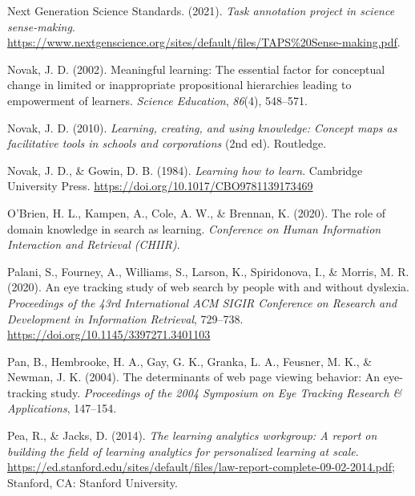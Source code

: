 \documentclass[letterpaper, nobind]{templates/ociamthesis}
\newlength{\cslhangindent}
\newenvironment{CSLReferences}[2] %
 {%
  \setlength{\parindent}{0pt}
  \ifodd #1
  \let\oldpar\par
  \def\par{\hangindent=\cslhangindent\oldpar}
  \fi
  \setlength{\parskip}{1mm}
  \setlength{\baselineskip}{6mm}
 }%
 {}
\begin{document}
\begin{CSLReferences}{1}{0}
\leavevmode{}%
Next Generation Science Standards. (2021). \emph{Task annotation project in science \textbar{} sense-making}. \url{https://www.nextgenscience.org/sites/default/files/TAPS\%20Sense-making.pdf}.

\leavevmode{}%
Novak, J. D. (2002). Meaningful learning: The essential factor for conceptual change in limited or inappropriate propositional hierarchies leading to empowerment of learners. \emph{Science Education}, \emph{86}(4), 548--571.

\leavevmode{}%
Novak, J. D. (2010). \emph{Learning, creating, and using knowledge: Concept maps as facilitative tools in schools and corporations} (2nd ed). {Routledge}.

\leavevmode{}%
Novak, J. D., \& Gowin, D. B. (1984). \emph{Learning how to learn}. Cambridge University Press. \url{https://doi.org/10.1017/CBO9781139173469}

\leavevmode{}%
O'Brien, H. L., Kampen, A., Cole, A. W., \& Brennan, K. (2020). The role of domain knowledge in search as learning. \emph{Conference on Human Information Interaction and Retrieval (CHIIR)}.

\leavevmode{}%
Palani, S., Fourney, A., Williams, S., Larson, K., Spiridonova, I., \& Morris, M. R. (2020). An eye tracking study of web search by people with and without dyslexia. \emph{Proceedings of the 43rd International ACM SIGIR Conference on Research and Development in Information Retrieval}, 729--738. \url{https://doi.org/10.1145/3397271.3401103}

\leavevmode{}%
Pan, B., Hembrooke, H. A., Gay, G. K., Granka, L. A., Feusner, M. K., \& Newman, J. K. (2004). The determinants of web page viewing behavior: An eye-tracking study. \emph{Proceedings of the 2004 Symposium on Eye Tracking Research \& Applications}, 147--154.

\leavevmode{}%
Pea, R., \& Jacks, D. (2014). \emph{The learning analytics workgroup: A report on building the field of learning analytics for personalized learning at scale}. \url{https://ed.stanford.edu/sites/default/files/law-report-complete-09-02-2014.pdf}; Stanford, CA: Stanford University.


\end{CSLReferences}
\end{document}

